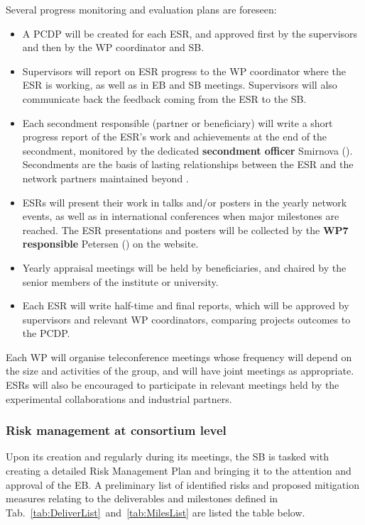 Several progress monitoring and evaluation plans are foreseen:
\begin{itemize}%
\item A PCDP will be created for each ESR, and approved first by the supervisors and then by the WP coordinator and SB.
\item Supervisors will report on ESR progress to the WP coordinator where the ESR is working, as well as in EB and SB meetings. 
Supervisors will also communicate back the feedback coming from the ESR to the SB.  
\item Each secondment responsible (partner or beneficiary) will write a short progress report of the ESR's work and achievements at the end of the secondment, monitored by the dedicated \textbf{secondment officer} Smirnova (\lundentity). 
Secondments are the basis of lasting relationships between the ESR and the network partners maintained beyond \acronym. 
\item ESRs will present their work in talks and/or posters in the yearly network events, as well as in international conferences when major milestones are reached. 
The ESR presentations and posters will be collected by the \textbf{WP7 responsible} Petersen (\cernentity) on the \acronym website. 
\item Yearly appraisal meetings will be held by beneficiaries, and chaired by the senior members of the institute or university.
\item Each ESR will write half-time and final reports, which will be approved by supervisors and relevant WP coordinators, comparing projects outcomes to the PCDP. 
\end{itemize}
Each WP will organise teleconference meetings whose frequency will depend on the size and activities of the group, and will have joint meetings as appropriate.
ESRs will also be encouraged to participate in relevant meetings held by the experimental collaborations and industrial partners.
 
\vspace{-2mm}
\subsubsection{Risk management at consortium level}

Upon its creation and regularly during its meetings, the SB is tasked with creating a detailed Risk Management Plan and bringing it to the attention and approval of the EB. 
A preliminary list of identified risks and proposed mitigation measures relating to the deliverables and milestones defined in Tab.~\ref{tab:DeliverList}~and~\ref{tab:MilesList} are listed the table below.

